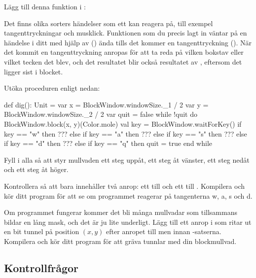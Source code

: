 \Subtask
Lägg till denna funktion i :
\noindent Det finns olika sorters händelser som ett  kan reagera på, till exempel tangenttryckningar och musklick.
Funktionen som du precis lagt in väntar på en händelse i ditt  med hjälp av () ända tills det kommer en tangenttryckning ().
När det kommit en tangenttryckning anropas  för att ta reda på vilken bokstav eller vilket tecken det blev, och det resultatet blir också resultatet av , eftersom det ligger sist i blocket.

\Subtask
Utöka proceduren  enligt nedan:
\begin{Code}
  def dig(): Unit = 
    var x = BlockWindow.windowSize._1 / 2
    var y = BlockWindow.windowSize._2 / 2
    var quit = false
    while !quit do
      BlockWindow.block(x, y)(Color.mole)
      val key = BlockWindow.waitForKey()
      if      key == "w" then ???
      else if key == "a" then ???
      else if key == "s" then ???
      else if key == "d" then ???
      else if key == "q" then quit = true
    end while
\end{Code}

\Subtask Fyll i alla  så att  styr mullvaden ett steg uppåt,  ett steg åt vänster,  ett steg nedåt och  ett steg åt höger.

\Subtask Kontrollera så att  bara innehåller två anrop: ett till  och ett till . Kompilera och kör ditt program för att se om programmet reagerar på tangenterna w, a, s och d.

\Subtask Om programmet fungerar kommer det bli många mullvadar som tillsammans bildar en lång mask, och det är ju lite underligt. Lägg till ett anrop i  som ritar ut en bit tunnel på position $(x, y)$ efter anropet till  men innan -satserna. Kompilera och kör ditt program för att gräva tunnlar med din blockmullvad.

\subsection{Kontrollfrågor}\Checkpoint

